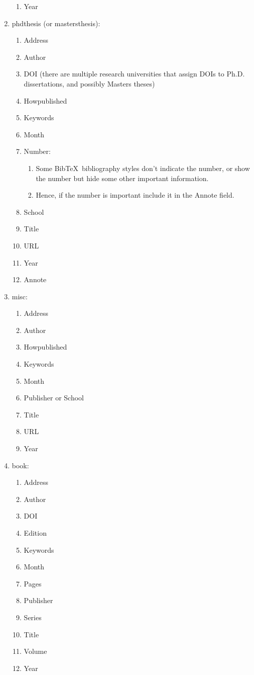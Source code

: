 \documentclass[letter,12pt]{article}
\begin{document}
\begin{enumerate}
\begin{enumerate}
	\item Year
	\end{enumerate}
\item phdthesis (or mastersthesis): \vspace{-0.3cm}
	\begin{enumerate} \itemsep -2pt
	\item Address
	\item Author
	\item DOI (there are multiple research universities that assign DOIs to Ph.D. dissertations, and possibly Masters theses)
	\item Howpublished
	\item Keywords
	\item Month
	\item Number: \vspace{-0.2cm}
		\begin{enumerate} \itemsep -2pt
		\item Some {\sc Bib}\TeX\ bibliography styles don't indicate the number, or show the number but hide some other important information.
		\item Hence, if the number is important include it in the Annote field.
		\end{enumerate}
	\item School
	\item Title
	\item URL
	\item Year
	\item Annote
	\end{enumerate}
\item misc: \vspace{-0.3cm}
	\begin{enumerate} \itemsep -2pt
	\item Address
	\item Author
	\item Howpublished
	\item Keywords
	\item Month
	\item Publisher or School
	\item Title
	\item URL
	\item Year
	\end{enumerate}
\item book: \vspace{-0.3cm}
	\begin{enumerate} \itemsep -2pt
	\item Address
	\item Author
	\item DOI
	\item Edition
	\item Keywords
	\item Month
	\item Pages
	\item Publisher
	\item Series
	\item Title
	\item Volume
	\item Year
	\end{enumerate}
\end{enumerate}
\end{document}
